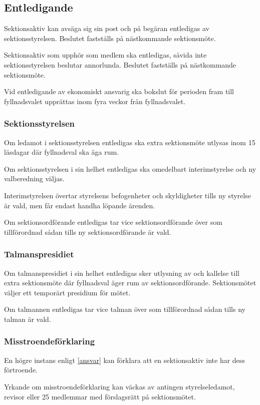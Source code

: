 \documentclass{styrdokument}
\begin{document}
\subsection{Entledigande}

\? Sektionsaktiv kan avsäga sig sin post och på begäran entledigas av sektionsstyrelsen.
Beslutet fastställs på nästkommande sektionsmöte.

\? Sektionsaktiv som upphör som medlem ska entledigas, såvida inte sektionsstyrelsen beslutar annorlunda.
Beslutet fastställs på nästkommande sektionsmöte.

\? Vid entledigande av ekonomiskt ansvarig ska bokslut för perioden fram till fyllnadsvalet upprättas inom fyra veckor från fyllnadsvalet.
\label{entle.bokslut}

\subsubsection{Sektionsstyrelsen}
\? Om ledamot i sektionsstyrelsen entledigas ska extra sektionsmöte utlysas inom 15 läsdagar där fyllnadsval ska äga rum.

\? Om sektionsstyrelsen i sin helhet entledigas ska omedelbart interimstyrelse och ny valberedning väljas.

\? Interimstyrelsen övertar styrelsens befogenheter och skyldigheter tills ny styrelse är vald, men får endast handha löpande ärenden.

\? Om sektionsordförande entledigas tar vice sektionsordförande över som tillförordnad sådan tills ny sektionsordförande är vald.

\subsubsection{Talmanspresidiet}
\? Om talmanspresidiet i sin helhet entledigas sker utlysning av och kallelse till extra sektionsmöte där fyllnadsval äger rum av sektionsordförande.
Sektionsmötet väljer ett temporärt presidium för mötet.

\? Om talmannen entledigas tar vice talman över som tillförordnad sådan tills ny talman är vald.

\subsubsection{Misstroendeförklaring}
\? En högre instans enligt \cref{ansvar} kan förklara att en sektionsaktiv inte har dess förtroende.

\? Yrkande om misstroendeförklaring kan väckas av antingen styrelseledamot, revisor eller 25 medlemmar med förslagsrätt på sektionsmötet.
\end{document}
